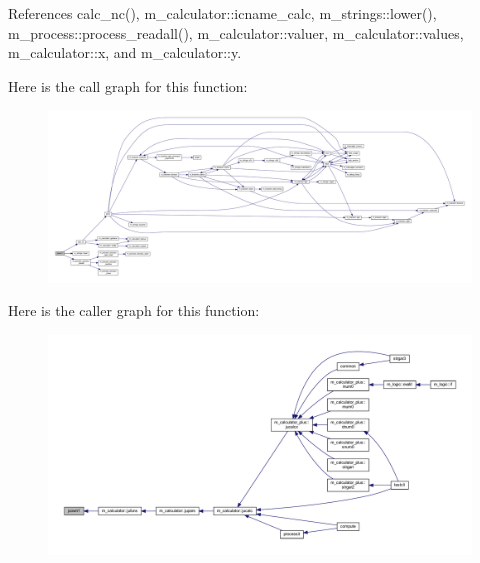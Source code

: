 References calc\+\_\+nc(), m\+\_\+calculator\+::icname\+\_\+calc, m\+\_\+strings\+::lower(), m\+\_\+process\+::process\+\_\+readall(), m\+\_\+calculator\+::valuer, m\+\_\+calculator\+::values, m\+\_\+calculator\+::x, and m\+\_\+calculator\+::y.

Here is the call graph for this function\+:
\nopagebreak
\begin{figure}[H]
\begin{center}
\leavevmode
\includegraphics[width=350pt]{juown1_8f90_a313c897cec3139ac9722b8f907c86495_cgraph}
\end{center}
\end{figure}
Here is the caller graph for this function\+:
\nopagebreak
\begin{figure}[H]
\begin{center}
\leavevmode
\includegraphics[width=350pt]{juown1_8f90_a313c897cec3139ac9722b8f907c86495_icgraph}
\end{center}
\end{figure}
